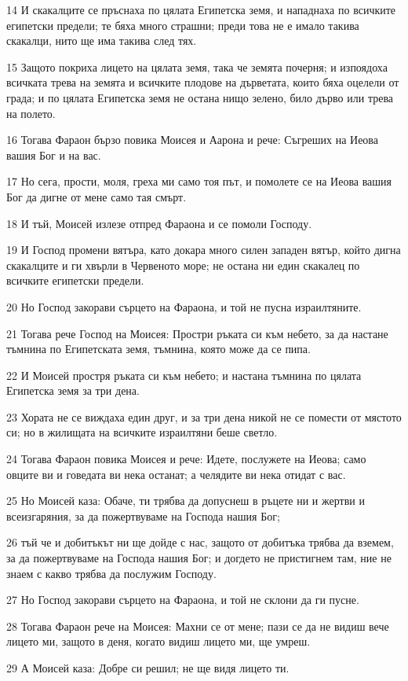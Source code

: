 \par 14 И скакалците се пръснаха по цялата Египетска земя, и нападнаха по всичките египетски предели; те бяха много страшни; преди това не е имало такива скакалци, нито ще има такива след тях.
\par 15 Защото покриха лицето на цялата земя, така че земята почерня; и изпоядоха всичката трева на земята и всичките плодове на дърветата, които бяха оцелели от града; и по цялата Египетска земя не остана нищо зелено, било дърво или трева на полето.
\par 16 Тогава Фараон бързо повика Моисея и Аарона и рече: Съгреших на Иеова вашия Бог и на вас.
\par 17 Но сега, прости, моля, греха ми само тоя път, и помолете се на Иеова вашия Бог да дигне от мене само тая смърт.
\par 18 И тъй, Моисей излезе отпред Фараона и се помоли Господу.
\par 19 И Господ промени вятъра, като докара много силен западен вятър, който дигна скакалците и ги хвърли в Червеното море; не остана ни един скакалец по всичките египетски предели.
\par 20 Но Господ закорави сърцето на Фараона, и той не пусна израилтяните.
\par 21 Тогава рече Господ на Моисея: Простри ръката си към небето, за да настане тъмнина по Египетската земя, тъмнина, която може да се пипа.
\par 22 И Моисей простря ръката си към небето; и настана тъмнина по цялата Египетска земя за три дена.
\par 23 Хората не се виждаха един друг, и за три дена никой не се помести от мястото си; но в жилищата на всичките израилтяни беше светло.
\par 24 Тогава Фараон повика Моисея и рече: Идете, послужете на Иеова; само овците ви и говедата ви нека останат; а челядите ви нека отидат с вас.
\par 25 Но Моисей каза: Обаче, ти трябва да допуснеш в ръцете ни и жертви и всеизгаряния, за да пожертвуваме на Господа нашия Бог;
\par 26 тъй че и добитъкът ни ще дойде с нас, защото от добитъка трябва да вземем, за да пожертвуваме на Господа нашия Бог; и догдето не пристигнем там, ние не знаем с какво трябва да послужим Господу.
\par 27 Но Господ закорави сърцето на Фараона, и той не склони да ги пусне.
\par 28 Тогава Фараон рече на Моисея: Махни се от мене; пази се да не видиш вече лицето ми, защото в деня, когато видиш лицето ми, ще умреш.
\par 29 А Моисей каза: Добре си решил; не ще видя лицето ти.


